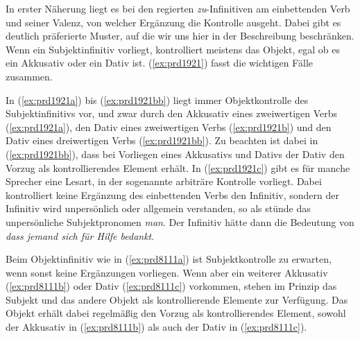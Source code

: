 \begin{exe}
\end{exe}

In erster Näherung liegt es bei den regierten \textit{zu}-Infinitiven am einbettenden Verb und seiner Valenz, von welcher Ergänzung die Kontrolle ausgeht.
Dabei gibt es deutlich präferierte Muster, auf die wir uns hier in der Beschreibung beschränken.
Wenn ein Subjektinfinitiv vorliegt, kontrolliert meistens das Objekt, egal ob es ein Akkusativ oder ein Dativ ist.
(\ref{ex:prd1921}) fasst die wichtigen Fälle zusammen.

\begin{exe}
  \ex\label{ex:prd1921} 
  \begin{xlist}
  \end{xlist}
\end{exe}

In (\ref{ex:prd1921a}) bis (\ref{ex:prd1921bb}) liegt immer Objektkontrolle des Subjektinfinitivs vor, und zwar durch den Akkusativ eines zweiwertigen Verbs (\ref{ex:prd1921a}), den Dativ eines zweiwertigen Verbs (\ref{ex:prd1921b}) und den Dativ eines dreiwertigen Verbs (\ref{ex:prd1921bb}).
Zu beachten ist dabei in (\ref{ex:prd1921bb}), dass bei Vorliegen eines Akkusativs und Dativs der Dativ den Vorzug als kontrollierendes Element erhält.
In (\ref{ex:prd1921c}) gibt es für manche Sprecher eine Lesart, in der sogenannte arbiträre Kontrolle vorliegt.
Dabei kontrolliert keine Ergänzung des einbettenden Verbs den Infinitiv, sondern der Infinitiv wird unpersönlich oder allgemein verstanden, so als stünde das unpersönliche Subjektpronomen \textit{man}.
Der Infinitiv hätte dann die Bedeutung von \textit{dass jemand sich für Hilfe bedankt}.

Beim Objektinfinitiv wie in (\ref{ex:prd8111a}) ist Subjektkontrolle zu erwarten, wenn sonst keine Ergänzungen vorliegen.
Wenn aber ein weiterer Akkusativ (\ref{ex:prd8111b}) oder Dativ (\ref{ex:prd8111c}) vorkommen, stehen im Prinzip das Subjekt und das andere Objekt als kontrollierende Elemente zur Verfügung.
Das Objekt erhält dabei regelmäßig den Vorzug als kontrollierendes Element, sowohl der Akkusativ in (\ref{ex:prd8111b}) als auch der Dativ in (\ref{ex:prd8111c}).


